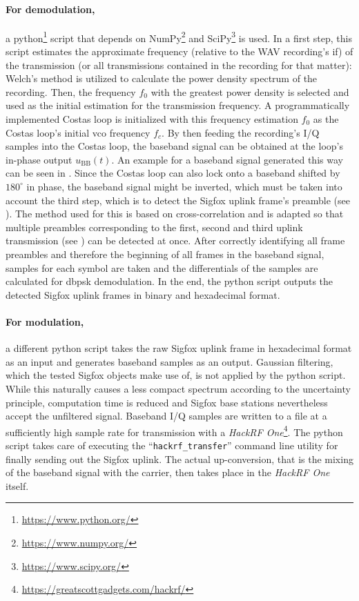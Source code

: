 \paragraph{For demodulation,} a python\footnote{\url{https://www.python.org/}} script that depends on NumPy\footnote{\url{https://www.numpy.org/}} and SciPy\footnote{\url{https://www.scipy.org/}} is used.
In a first step, this script estimates the approximate frequency (relative to the WAV recording's \gls{if}) of the transmission (or all transmissions contained in the recording for that matter):
Welch's method \cite{welchsmethod} is utilized to calculate the power density spectrum of the recording.
Then, the frequency $f_0$ with the greatest power density is selected and used as the initial estimation for the transmission frequency.
A programmatically implemented Costas loop is initialized with this frequency estimation $f_0$ as the Costas loop's initial \gls{vco} frequency $f_c$.
By then feeding the recording's I/Q samples into the Costas loop, the baseband signal can be obtained at the loop's in-phase output $u_\mathrm{BB}(t)$.
An example for a baseband signal generated this way can be seen in .
Since the Costas loop can also lock onto a baseband shifted by $180^\circ$ in phase, the baseband signal might be inverted, which must be taken into account the third step, which is to detect the Sigfox uplink frame's preamble (see ).
The method used for this is based on cross-correlation and is adapted so that multiple preambles corresponding to the first, second and third uplink transmission (see ) can be detected at once.
After correctly identifying all frame preambles and therefore the beginning of all frames in the baseband signal, samples for each symbol are taken and the differentials of the samples are calculated for \gls{dbpsk} demodulation.
In the end, the python script outputs the detected Sigfox uplink frames in binary and hexadecimal format.

\paragraph{For modulation,} a different python script takes the raw Sigfox uplink frame in hexadecimal format as an input and generates baseband samples as an output.
Gaussian filtering, which the tested Sigfox objects make use of, is not applied by the python script.
While this naturally causes a less compact spectrum according to the uncertainty principle, computation time is reduced and Sigfox base stations nevertheless accept the unfiltered signal.
Baseband I/Q samples are written to a file at a sufficiently high sample rate for transmission with a \textit{HackRF One}\footnote{\url{https://greatscottgadgets.com/hackrf/}}.
The python script takes care of executing the ``\texttt{hackrf\_transfer}'' command line utility for finally sending out the Sigfox uplink.
The actual up-conversion, that is the mixing of the baseband signal with the carrier, then takes place in the \textit{HackRF One} itself.

